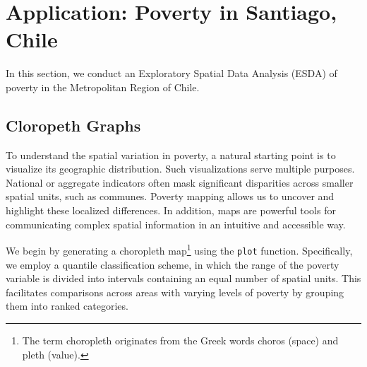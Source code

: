 


\section{Application: Poverty in Santiago, Chile}

In this section, we conduct an Exploratory Spatial Data Analysis (ESDA) of poverty in the Metropolitan Region of Chile.


\subsection{Cloropeth Graphs}

To understand the spatial variation in poverty, a natural starting point is to visualize its geographic distribution. Such visualizations serve multiple purposes. National or aggregate indicators often mask significant disparities across smaller spatial units, such as communes. Poverty mapping allows us to uncover and highlight these localized differences. In addition, maps are powerful tools for communicating complex spatial information in an intuitive and accessible way.

We begin by generating a choropleth map\footnote{The term choropleth originates from the Greek words choros (space) and pleth (value).} using the \verb|plot| function. Specifically, we employ a quantile classification scheme, in which the range of the poverty variable is divided into intervals containing an equal number of spatial units. This facilitates comparisons across areas with varying levels of poverty by grouping them into ranked categories.


